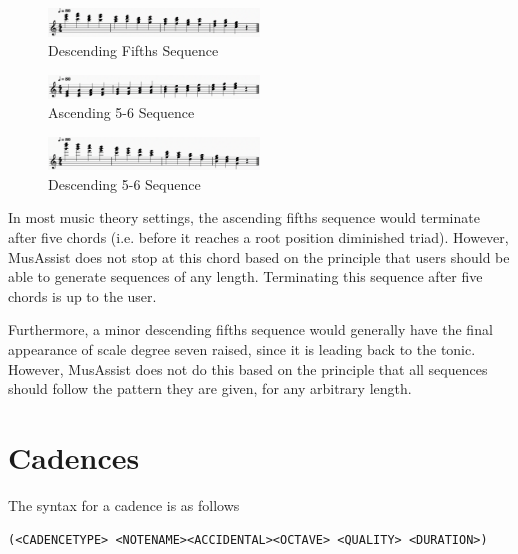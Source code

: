 \documentclass{report}
\begin{document}
\begin{figure}[h!]
\centering
\includegraphics[width=0.5\textwidth]{images/descfifths}
  \caption{Descending Fifths Sequence}
\end{figure}

\begin{figure}[h!]
\centering
\includegraphics[width=0.5\textwidth]{images/asc56}
  \caption{Ascending 5-6 Sequence}
\end{figure}

\begin{figure}[h!]
\centering
\includegraphics[width=0.5\textwidth]{images/desc56}
  \caption{Descending 5-6 Sequence}
  \label{fig:desc56}
\end{figure}

\newpage

In most music theory settings, the ascending fifths sequence would terminate after five chords (i.e. before it reaches a root position diminished  triad). However, MusAssist does not stop at this chord based on the principle that users should be able to generate sequences of any length. Terminating this sequence after five chords is up to the user.

Furthermore, a minor descending fifths sequence would generally have the final appearance of scale degree seven raised, since it is leading back to the tonic. However, MusAssist does not do this based on the principle that all sequences should follow the pattern they are given, for any arbitrary length. 

\section{Cadences}

The syntax for a cadence is as follows

\begin{verbatim}
(<CADENCETYPE> <NOTENAME><ACCIDENTAL><OCTAVE> <QUALITY> <DURATION>)
\end{verbatim}
\end{document}
